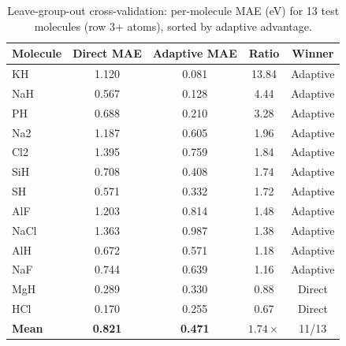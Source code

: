 \documentclass[aps,prb,twocolumn,superscriptaddress,longbibliography,floatfix]{revtex4-2}
\begin{document}
\begin{table}[h]
  \caption{Leave-group-out cross-validation: per-molecule MAE (eV) for 13 test molecules (row 3+ atoms), sorted by adaptive advantage.}
  \label{tab:dft_lgo}
  \begin{ruledtabular}
  \begin{tabular}{lcccc}
    Molecule & Direct MAE & Adaptive MAE & Ratio & Winner \\
    \hline
    KH   & 1.120 & 0.081 & 13.84 & Adaptive \\
    NaH  & 0.567 & 0.128 & 4.44 & Adaptive \\
    PH   & 0.688 & 0.210 & 3.28 & Adaptive \\
    Na2  & 1.187 & 0.605 & 1.96 & Adaptive \\
    Cl2  & 1.395 & 0.759 & 1.84 & Adaptive \\
    SiH  & 0.708 & 0.408 & 1.74 & Adaptive \\
    SH   & 0.571 & 0.332 & 1.72 & Adaptive \\
    AlF  & 1.203 & 0.814 & 1.48 & Adaptive \\
    NaCl & 1.363 & 0.987 & 1.38 & Adaptive \\
    AlH  & 0.672 & 0.571 & 1.18 & Adaptive \\
    NaF  & 0.744 & 0.639 & 1.16 & Adaptive \\
    MgH  & 0.289 & 0.330 & 0.88 & Direct \\
    HCl  & 0.170 & 0.255 & 0.67 & Direct \\
    \hline
    \textbf{Mean} & \textbf{0.821} & \textbf{0.471} & $\mathbf{1.74\times}$ & 11/13 \\
  \end{tabular}
  \end{ruledtabular}
\end{table}
\end{document}
